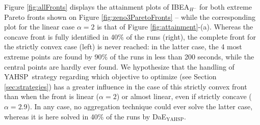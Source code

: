 \documentclass{llncs}
\newcommand{\DAEYAHSP}{{\sc DaE$_{\text{YAHSP}}$}}
\def\YAHSP{{\sc YAHSP}}
\begin{document}
Figure \ref{fig:allFronts} displays the attainment plots of IBEA$_{H^-}$ for both extreme Pareto fronts shown on Figure \ref{fig:zeno3ParetoFronts} -- while the corresponding plot for the linear case $\alpha=2$ is that of Figure \ref{fig:attainment}-(a). 
Whereas the concave front is fully identified in 40\% of the runs (right), the complete front for the strictly convex case (left) is never reached: in the latter case, the 4 most extreme points are found by 90\% of the runs in less than 200 seconds, while the central points are hardly ever found. We hypothesize that the handling of \YAHSP\ strategy regarding which objective to optimize (see Section \ref{sec:strategies}) has a greater influence in the case of this strictly convex front than when the front is linear ($\alpha=2$) or almost linear, even if strictly concave ($\alpha=2.9$). In any case, no aggregation technique could ever solve the latter case, whereas it is here solved in 40\% of the runs by \DAEYAHSP.
\end{document}
